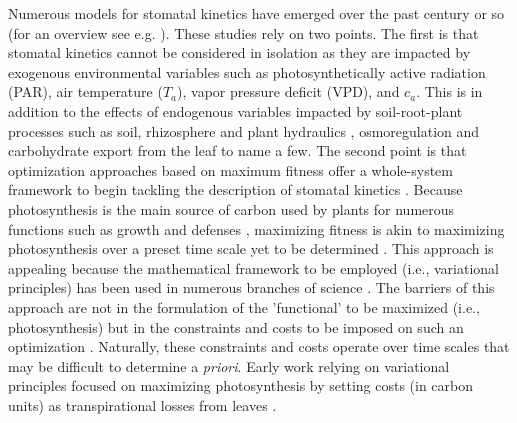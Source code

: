 \documentclass[utf8]{frontiersSCNS} %
\begin{document}
Numerous models for stomatal kinetics have emerged over the past century or so (for an overview see e.g. \citet{jarvis1976interpretation,collatz_physiological_1991,leuning_critical_1995,damour2010overview,way2011well} ). These studies rely on two points.  The first is that stomatal kinetics cannot be considered in isolation as they are impacted by exogenous environmental variables \citep{jarvis1976interpretation,pearcy1990sunflecks,mott1991stomatal,medlyn_temperature_2002} such as photosynthetically active radiation (PAR), air temperature ($T_a$), vapor pressure deficit (VPD), and $c_a$. This is in addition to the effects of endogenous variables impacted by soil-root-plant processes such as soil, rhizosphere and plant hydraulics \citep{sperry_hydraulic_2000, brodribb_relations_2003}, osmoregulation and carbohydrate export from the leaf \citep{nikinmaa_assimilate_2013,sevanto_how_2014,jensen2016sap,konrad2018xylem} to name a few. The second point is that optimization approaches based on maximum fitness offer a whole-system framework to begin tackling the description of stomatal kinetics \citep{manzoni_optimizing_2011,manzoni_optimization_2013,huang2018transport}. Because photosynthesis is the main source of carbon used by plants for numerous functions such as growth and defenses \citep{novick2012increased}, maximizing fitness is akin to maximizing photosynthesis over a preset time scale yet to be determined \citep{cowan1971relative,givnish1976sizes,cowan_stomatal_1977,dewar2010maximum}.  This approach is appealing because the mathematical framework to be employed (i.e., variational principles) has been used in numerous branches of science \citep{witelski_variational_2015}.  The barriers of this approach are not in the formulation of the 'functional' to be maximized (i.e., photosynthesis) but in the constraints and costs to be imposed on such an optimization \citep{dewar2018new}.  Naturally, these constraints and costs operate over time scales that may be difficult to determine a \textit{priori}.  Early work relying on variational principles focused on maximizing photosynthesis by setting costs (in carbon units) as transpirational losses from leaves  \citep{cowan_stomatal_1977,cowan_stomatal_1978}. 
\end{document}

